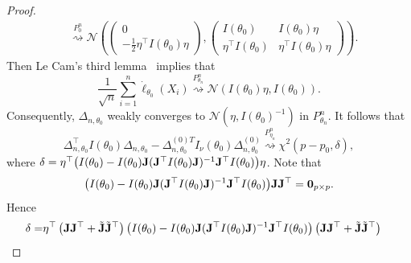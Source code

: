 \documentclass[11pt]{article}
\theoremstyle{plain}
\theoremstyle{definition}
\theoremstyle{remark}
\begin{document}
\begin{appendices}
\begin{proof}
\begin{equation*}
\begin{split}
    &\overset{P_0^n}{\rightsquigarrow}
    \mathcal{N}\left(
    \left(
    \begin{matrix}
        0\\
        -\frac{1}{2}\eta^\top  I(\theta_0)\eta
    \end{matrix}
    \right),
    \left(
        \begin{matrix}
            I(\theta_0)&I(\theta_0)\eta\\
            \eta^\top  I(\theta_0)&\eta^\top  I(\theta_0)\eta
        \end{matrix}
    \right)
    \right).
    \end{split}
\end{equation*}
Then Le Cam's third lemma~\citep[Example 6.7]{van2000asymptotic} implies that
\begin{equation*}
    \frac{1}{\sqrt{n}}\sum^n_{i=1}\dot{\ell}_{\theta_0}(X_i)\overset{P^n_{\theta_n}}{\rightsquigarrow} \mathcal{N}(I(\theta_0)\eta,I(\theta_0)).
\end{equation*}
Consequently,
$
\Delta_{n,\theta_0}
$
weakly converges to $\mathcal{N}(\eta, I(\theta_0)^{-1})$ in  $P^n_{\theta_n}$.
It follows that
\begin{equation*}
\Delta_{n,\theta_0}^\top  I(\theta_0) \Delta_{n,\theta_0}
-
\Delta_{n,\theta_0}^{{(0)}T} I_\nu(\theta_0) \Delta^{(0)}_{n,\theta_0}
\overset{P_{\eta_n}^n}{\rightsquigarrow} \chi^2(p-p_0,\delta),
\end{equation*}
where $\delta =
\eta^\top 
             \big(
             I(\theta_0)
            -
            I(\theta_0) \mathbf{J} (\mathbf{J}^\top  I(\theta_0) \mathbf{J})^{-1} \mathbf{J}^\top  I(\theta_0)
        \big)
\eta$.
Note that
\begin{align*}
             \big(
             I(\theta_0)
            -
            I(\theta_0) \mathbf{J} (\mathbf{J}^\top  I(\theta_0) \mathbf{J})^{-1} \mathbf{J}^\top  I(\theta_0)
        \big)
        \mathbf{J} \mathbf{J}^\top = \mathbf 0_{p\times p}.
\end{align*}
Hence
\begin{align*}
    \delta=&
\eta^\top 
        \left( \BJ \BJ^\top + \tilde \BJ \tilde \BJ^\top \right)
             \big(
             I(\theta_0)
            -
            I(\theta_0) \BJ (\BJ^\top  I(\theta_0) \BJ)^{-1} \BJ^\top  I(\theta_0)
        \big)
        \left( \BJ \BJ^\top + \tilde \BJ \tilde \BJ^\top \right)

\end{align*}
\end{proof}
\end{appendices}
\end{document}
